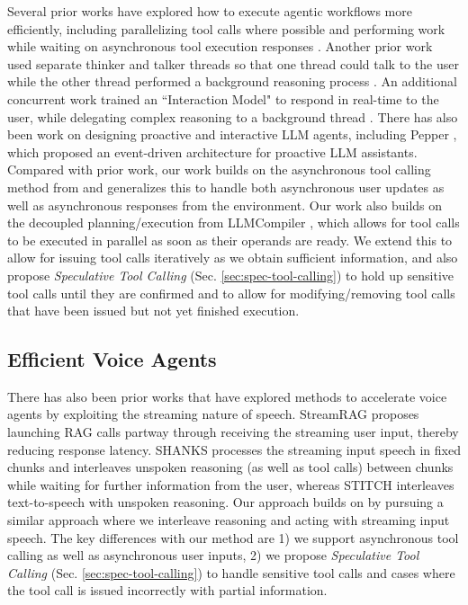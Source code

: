 Several prior works have explored how to execute agentic workflows more efficiently, including parallelizing tool calls where possible \citep{kim2024llm} and performing work while waiting on asynchronous tool execution responses \citep{gim2024asynchronous}.
Another prior work used separate thinker and talker threads so that one thread could talk to the user while the other thread performed a background reasoning process \citep{yakushev2025asynchronous}.
An additional concurrent work trained an ``Interaction Model" to respond in real-time to the user, while delegating complex reasoning to a background thread \cite{thinkingmachines2026interactionmodels}.
There has also been work on designing proactive and interactive LLM agents, including Pepper \citep{rllm2025pepper}, which proposed an event-driven architecture for proactive LLM assistants.
Compared with prior work, our work builds on the asynchronous tool calling method from \citep{gim2024asynchronous} and generalizes this to handle both asynchronous user updates as well as asynchronous responses from the environment.
Our work also builds on the decoupled planning/execution from LLMCompiler \citep{kim2024llm}, which allows for tool calls to be executed in parallel as soon as their operands are ready.
We extend this to allow for issuing tool calls iteratively as we obtain sufficient information, and also propose \textit{Speculative Tool Calling} (Sec. \ref{sec:spec-tool-calling}) to hold up sensitive tool calls until they are confirmed and to allow for modifying/removing tool calls that have been issued but not yet finished execution.

\subsection{Efficient Voice Agents}

There has also been prior works that have explored methods to accelerate voice agents by exploiting the streaming nature of speech.
StreamRAG \citep{arora2025stream} proposes launching RAG calls partway through receiving the streaming user input, thereby reducing response latency.
SHANKS \citep{chiang2025shanks} processes the streaming input speech in fixed chunks and interleaves unspoken reasoning (as well as tool calls) between chunks while waiting for further information from the user, whereas STITCH \citep{chiang2025stitch} interleaves text-to-speech with unspoken reasoning.
Our approach builds on \citep{chiang2025shanks} by pursuing a similar approach where we interleave reasoning and acting with streaming input speech. 
The key differences with our method are 1) we support asynchronous tool calling as well as asynchronous user inputs, 2) we propose \textit{Speculative Tool Calling} (Sec. \ref{sec:spec-tool-calling}) to handle sensitive tool calls and cases where the tool call is issued incorrectly with partial information. 

